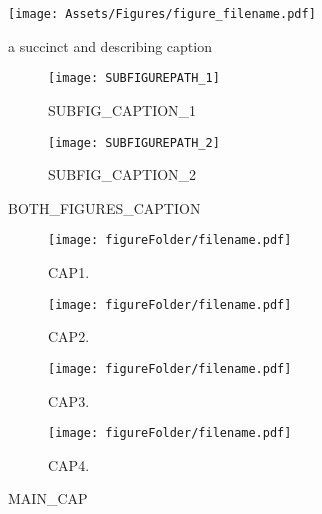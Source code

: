 \begin{figure}[h]
	\centering
	\texttt{[image: Assets/Figures/figure\_filename.pdf]}
	\caption{a succinct and describing caption}
	\label{fig:reference_label}
\end{figure}

\begin{figure}[ht!]
	\centering
		\begin{subfigure}[t]{.5\textwidth}
			\centering\captionsetup{width=.9\linewidth}%
			\texttt{[image: SUBFIGUREPATH\_1]}
			\caption{SUBFIG_CAPTION_1}
			\label{SUBFIG_LABEL_1}
		\end{subfigure}%
		\begin{subfigure}[t]{.5\textwidth}
			\centering\captionsetup{width=.9\linewidth}%
			\texttt{[image: SUBFIGUREPATH\_2]}
			\caption{SUBFIG_CAPTION_2}
			\label{SUBFIG_LABEL_2}
		\end{subfigure}
	\caption{BOTH_FIGURES_CAPTION}
	\label{BOTH_FIGURES_LABEL}
\end{figure}

\begin{figure}[ht!]
	\begin{subfigure}[b]{0.5\textwidth}
		\centering\captionsetup{width=.9\linewidth}%
		\texttt{[image: figureFolder/filename.pdf]}
		\caption{CAP1.}
		\label{fig:sub:x1}
	\end{subfigure}
	\begin{subfigure}[b]{0.5\textwidth}
		\centering\captionsetup{width=.9\linewidth}%
		\texttt{[image: figureFolder/filename.pdf]}
		\caption{CAP2.}
		\label{fig:sub:x2}
	\end{subfigure}
	\begin{subfigure}[b]{0.5\textwidth}
		\centering\captionsetup{width=.9\linewidth}%
		\texttt{[image: figureFolder/filename.pdf]}
		\caption{CAP3.}
		\label{fig:sub:x3}
	\end{subfigure}
	\begin{subfigure}[b]{0.5\textwidth}
		\centering\captionsetup{width=.9\linewidth}%
		\texttt{[image: figureFolder/filename.pdf]}
		\caption{CAP4.}
		\label{fig:sub:x4}
	\end{subfigure}
	\caption{MAIN_CAP}
	\label{fig:x}
\end{figure}